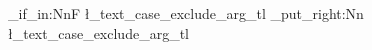 \def\flm@cite@bookmark@note#1]#2{}
\ExplSyntaxOn
\tl_if_in:NnF \l_text_case_exclude_arg_tl { \flmCite } { \tl_put_right:Nn \l_text_case_exclude_arg_tl { \flmCite } }
\ExplSyntaxOff
%
%
%
%
